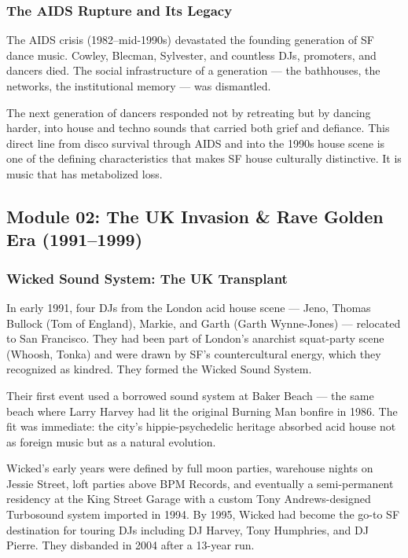 \documentclass[11pt,letterpaper]{article}
\begin{document}
\subsubsection{The AIDS Rupture and Its Legacy}

The AIDS crisis (1982--mid-1990s) devastated the founding generation of SF dance music. Cowley, Blecman, Sylvester, and countless DJs, promoters, and dancers died. The social infrastructure of a generation --- the bathhouses, the networks, the institutional memory --- was dismantled.

The next generation of dancers responded not by retreating but by dancing harder, into house and techno sounds that carried both grief and defiance. This direct line from disco survival through AIDS and into the 1990s house scene is one of the defining characteristics that makes SF house culturally distinctive. It is music that has metabolized loss.

\subsection{Module 02: The UK Invasion \& Rave Golden Era (1991--1999)}

\subsubsection{Wicked Sound System: The UK Transplant}

In early 1991, four DJs from the London acid house scene --- Jeno, Thomas Bullock (Tom of England), Markie, and Garth (Garth Wynne-Jones) --- relocated to San Francisco. They had been part of London's anarchist squat-party scene (Whoosh, Tonka) and were drawn by SF's countercultural energy, which they recognized as kindred. They formed the Wicked Sound System.

Their first event used a borrowed sound system at Baker Beach --- the same beach where Larry Harvey had lit the original Burning Man bonfire in 1986. The fit was immediate: the city's hippie-psychedelic heritage absorbed acid house not as foreign music but as a natural evolution.

Wicked's early years were defined by full moon parties, warehouse nights on Jessie Street, loft parties above BPM Records, and eventually a semi-permanent residency at the King Street Garage with a custom Tony Andrews-designed Turbosound system imported in 1994. By 1995, Wicked had become the go-to SF destination for touring DJs including DJ Harvey, Tony Humphries, and DJ Pierre. They disbanded in 2004 after a 13-year run.
\end{document}
